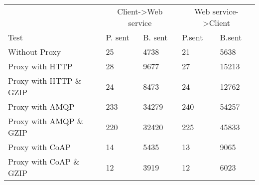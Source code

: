 \begin{tabularx}{\textwidth}{lXXXX}
\hline
\multicolumn{1}{l}{}                  & \multicolumn{2}{c}{Client->Web service}                           & \multicolumn{2}{c}{Web service->Client}                           \\
\multicolumn{1}{l}{Test} & \multicolumn{1}{l}{P. sent} & \multicolumn{1}{l}{B. sent} & \multicolumn{1}{l}{P.sent} & \multicolumn{1}{l}{B.sent} \\ \hline
Without Proxy                   & 25             & 4738           & 21             & 5638           \\
Proxy with HTTP                 & 28             & 9677           & 27             & 15213          \\
Proxy with HTTP \& GZIP         & 24             & 8473           & 24             & 12762          \\
Proxy with AMQP                 & 233            & 34279          & 240            & 54257          \\
Proxy with AMQP \& GZIP         & 220            & 32420          & 225            & 45833          \\
Proxy with CoAP                 & 14             & 5435           & 13             & 9065           \\
Proxy with CoAP \& GZIP         & 12             & 3919           & 12             & 6023           \\
\end{tabularx}
